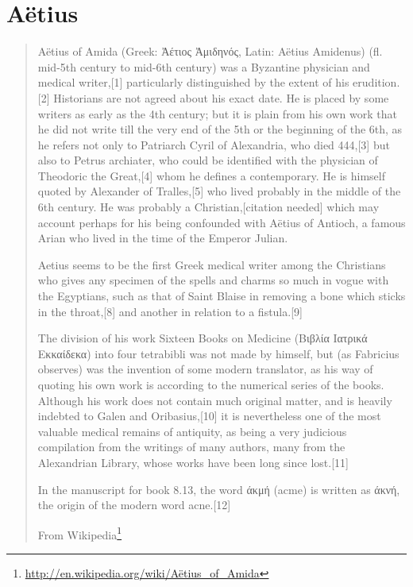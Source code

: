 \documentclass[12pt,letterpaper,twoside,final]{memoir}
\begin{document}
\section{Aëtius}%
\blockquote[From Wikipedia\footnote{\url{http://en.wikipedia.org/wiki/Aëtius_of_Amida}}]{Aëtius of Amida (Greek: Ἀέτιος Ἀμιδηνός, Latin: Aëtius Amidenus) (fl. mid-5th century to mid-6th century) was a Byzantine physician and medical writer,[1] particularly distinguished by the extent of his erudition.[2] Historians are not agreed about his exact date. He is placed by some writers as early as the 4th century; but it is plain from his own work that he did not write till the very end of the 5th or the beginning of the 6th, as he refers not only to Patriarch Cyril of Alexandria, who died 444,[3] but also to Petrus archiater, who could be identified with the physician of Theodoric the Great,[4] whom he defines a contemporary. He is himself quoted by Alexander of Tralles,[5] who lived probably in the middle of the 6th century. He was probably a Christian,[citation needed] which may account perhaps for his being confounded with Aëtius of Antioch, a famous Arian who lived in the time of the Emperor Julian.



Aetius seems to be the first Greek medical writer among the Christians who gives any specimen of the spells and charms so much in vogue with the Egyptians, such as that of Saint Blaise in removing a bone which sticks in the throat,[8] and another in relation to a fistula.[9]

The division of his work Sixteen Books on Medicine (Βιβλία Ιατρικά Εκκαίδεκα) into four tetrabibli was not made by himself, but (as Fabricius observes) was the invention of some modern translator, as his way of quoting his own work is according to the numerical series of the books. Although his work does not contain much original matter, and is heavily indebted to Galen and Oribasius,[10] it is nevertheless one of the most valuable medical remains of antiquity, as being a very judicious compilation from the writings of many authors, many from the Alexandrian Library, whose works have been long since lost.[11]

In the manuscript for book 8.13, the word άκμή (acme) is written as άκνή, the origin of the modern word acne.[12]}
\end{document}
